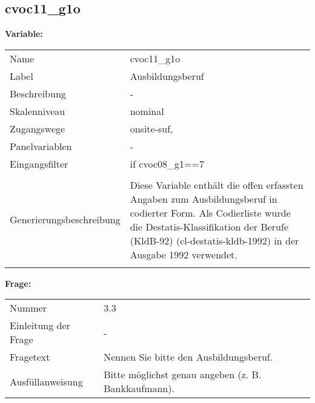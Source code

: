	
	
	\subsection{cvoc11\_g1o}
	\label{subSection:cvoc11_g1o}

	\noindent\textbf{Variable:}\\
		\begin{tabular}{lL{11.3cm}}
			\label{tableVariable:cvoc11_g1o}
			Name & cvoc11\_g1o \\
			Label & Ausbildungsberuf \\
			Beschreibung & - \\
			Skalenniveau & nominal \\
			Zugangswege &
				onsite-suf,
 \\
			Panelvariablen & -
			 \\
			Eingangsfilter & if cvoc08\_g1==7 \\
 \\
					Generierungsbeschreibung & Diese Variable enthält die offen erfassten Angaben zum Ausbildungsberuf in codierter Form. Als Codierliste wurde die Destatis-Klassifikation der Berufe (KldB-92) (cl-destatis-kldb-1992) in der Ausgabe 1992 verwendet. 
				 \\	
			 \\
		\end{tabular}

		\vspace*{1 cm}
		\noindent\textbf{Frage:}\\
		\begin{tabular}{lL{11.3cm}}
			\label{tableQuestion:cvoc11_g1o}
			Nummer & 3.3 \\
			Einleitung der Frage & - \\
			Fragetext & Nennen Sie bitte den Ausbildungsberuf. \\
			Ausfüllanweisung & Bitte möglichst genau angeben (z. B. Bankkaufmann). \\
		\end{tabular}





